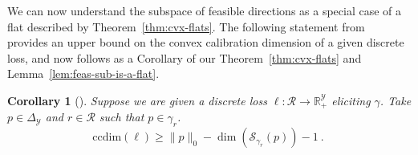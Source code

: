 \documentclass{article}
\newcommand{\reals}{\mathbb{R}}
\newcommand{\simplex}{\Delta_\Y}
\newcommand{\ccdim}{\mathrm{ccdim}}
\newcommand{\R}{\mathcal{R}}
\renewcommand{\S}{\mathcal{S}}
\newcommand{\Y}{\mathcal{Y}}
\newtheorem{corollary}{Corollary}
\begin{document}
We can now understand the subspace of feasible directions as a special case of a flat described by Theorem~\ref{thm:cvx-flats}.
The following statement from~\cite{ramaswamy2016convex} provides an upper bound on the convex calibration dimension of a given discrete loss, and now follows as a Corollary of our Theorem~\ref{thm:cvx-flats} and Lemma~\ref{lem:feas-sub-is-a-flat}.

\begin{corollary}[\cite{ramaswamy2016convex}]\label{cor:fsd-bound}
	Suppose we are given a discrete loss $\ell:\R \to \reals^\Y_+$ eliciting $\gamma$.
	Take $p \in \simplex$ and $r \in \R$ such that $p \in \gamma_r$.
	\begin{equation}
	\ccdim(\ell) \geq \|p\|_0 - \dim(\S_{\gamma_r}(p)) - 1~.~
	\end{equation}
\end{corollary}
\end{document}
